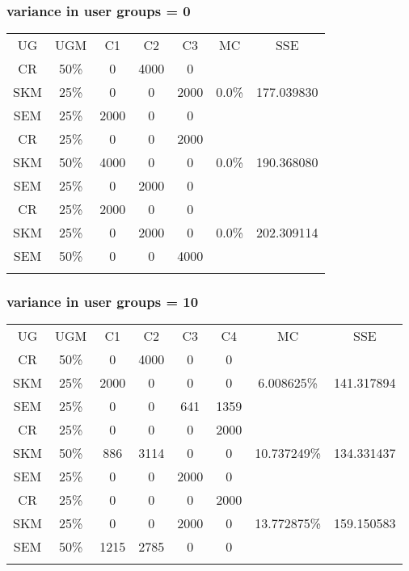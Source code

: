 \documentclass[10pt,a4paper]{article}
\begin{document}
	\subsubsection{variance in user groups = 0}
	\begin{table}[H]
		\centering
		\begin{tabular}{|c||c|c|c|c||c|c|}
			\hline
			UG & UGM & C1 & C2 & C3 & MC & SSE \\
			\hhline{|=======|}
			CR & 50\% & 0 & 4000 & 0 & \multirow{3}{*}{0.0\%} & \multirow{3}{*}{177.039830} \\
			SKM & 25\% & 0 & 0 & 2000 & & \\
			SEM & 25\% & 2000 & 0 & 0 & & \\
			\hhline{|=======|}
			CR & 25\% & 0 & 0 & 2000 & \multirow{3}{*}{0.0\%} & \multirow{3}{*}{190.368080} \\
			SKM & 50\% & 4000 & 0 & 0 & & \\
			SEM & 25\% & 0 & 2000 & 0 & & \\
			\hhline{|=======|}
			CR & 25\% & 2000 & 0 & 0 & \multirow{3}{*}{0.0\%} & \multirow{3}{*}{202.309114} \\
			SKM & 25\% & 0 & 2000 & 0 & & \\
			SEM & 50\% & 0 & 0 & 4000 & & \\
			\hhline{|=======|}
		\end{tabular}
	\end{table}
	
	\subsubsection{variance in user groups = 10}
	\begin{table}[H]
		\centering
		\begin{tabular}{|c||c|c|c|c|c||c|c|}
			\hline
			UG & UGM & C1 & C2 & C3 & C4 & MC & SSE \\
			\hhline{|========|}
			CR & 50\% & 0 & 4000 & 0 & 0 & \multirow{3}{*}{6.008625\%} & \multirow{3}{*}{141.317894} \\
			SKM & 25\% & 2000 & 0 & 0 & 0 & & \\
			SEM & 25\% & 0 & 0 & 641 & 1359 & & \\
			\hhline{|========|}
			CR & 25\% & 0 & 0 & 0 & 2000 & \multirow{3}{*}{10.737249\%} & \multirow{3}{*}{134.331437} \\
			SKM & 50\% & 886 & 3114 & 0 & 0 & & \\
			SEM & 25\% & 0 & 0 & 2000 & 0 & & \\
			\hhline{|========|}
			CR & 25\% & 0 & 0 & 0 & 2000 & \multirow{3}{*}{13.772875\%} & \multirow{3}{*}{159.150583} \\
			SKM & 25\% & 0 & 0 & 2000 & 0 & & \\
			SEM & 50\% & 1215 & 2785 & 0 & 0 & & \\
			\hhline{|========|}
		\end{tabular}
\end{table}
\end{document}
